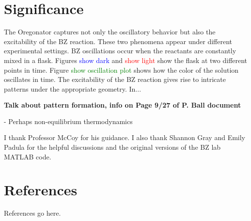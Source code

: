 \documentclass[twocolumn,amsmath,amssymb,aps]{revtex4}
\begin{document}
\section{Significance}

The Oregonator captures not only the oscillatory behavior but also the excitability of the BZ reaction. These two phenomena appear under different experimental settings. BZ oscillations occur when the reactants are constantly mixed in a flask. Figures \textcolor{blue}{show dark} and \textcolor{red}{show light} show the flask at two different points in time. Figure \textcolor{green}{show oscillation plot} shows how the color of the solution oscillates in time. The excitability of the BZ reaction gives rise to intricate patterns under the appropriate geometry. In... 


\textbf{Talk about pattern formation, info on Page 9/27 of P. Ball document}







- Perhaps non-equilibrium thermodynamics




\begin{acknowledgments}
I thank Professor McCoy for his guidance. I also thank Shannon Gray and Emily Padula for the helpful discussions and the original versions of the BZ lab MATLAB code.  
\end{acknowledgments}




\section{References}

References go here.


\end{document}
